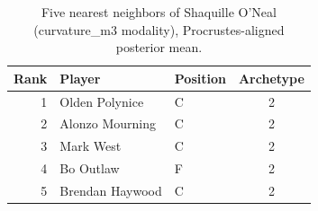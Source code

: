 \begin{table}[htbp]
  \centering\small
  \begin{tabular}{rllc}
    \toprule
    Rank & Player & Position & Archetype \\
    \midrule
    1 & Olden Polynice & C & 2 \\
    2 & Alonzo Mourning & C & 2 \\
    3 & Mark West & C & 2 \\
    4 & Bo Outlaw & F & 2 \\
    5 & Brendan Haywood & C & 2 \\
    \bottomrule
  \end{tabular}
  \caption{Five nearest neighbors of Shaquille O'Neal (curvature_m3 modality), Procrustes-aligned posterior mean.}
  \label{tab:Shaquille_O_Neal_neighbors_curvature_m3}
\end{table}

